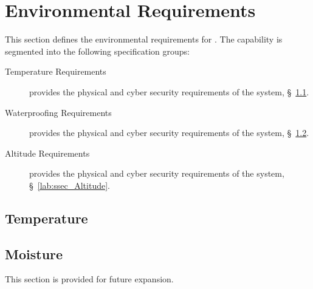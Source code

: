 \KNEADSECTIONNEWPAGE
\section{Environmental Requirements}
\label{lab:sec_Environmental}
% 

This section defines the environmental requirements for \ThisSys. The \ThisSys capability is segmented into the following specification groups:

\begin{description}
	\item [Temperature Requirements] provides the physical and cyber security requirements of the system, \S~\ref{lab:ssec_Environmental_Temperature}.
	\item [Waterproofing Requirements] provides the physical and cyber security requirements of the system, \S~\ref{lab:ssec_Environmental_Moisture}.
	\item [Altitude Requirements] provides the physical and cyber security requirements of the system, \S~\ref{lab:ssec_Altitude}.
\end{description}

\KNEADSUBSECTIONNEWPAGE
\subsection{Temperature}
\label{lab:ssec_Environmental_Temperature}



\subsection{Moisture}
\label{lab:ssec_Environmental_Moisture}

This section is provided for future expansion.



